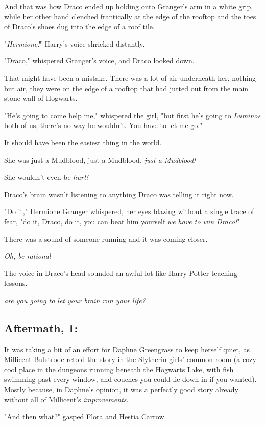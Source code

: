 And that was how Draco ended up holding onto Granger's arm in a white grip,
while her other hand clenched frantically at the edge of the rooftop and the
toes of Draco's shoes dug into the edge of a roof tile.

"\emph{Hermione!}" Harry's voice shrieked distantly.

"Draco," whispered Granger's voice, and Draco looked down.

That might have been a mistake. There was a lot of air underneath her, nothing
but air, they were on the edge of a rooftop that had jutted out from the main
stone wall of Hogwarts.

"He's going to come help me," whispered the girl, "but first he's going to
\emph{Luminos} both of us, there's no way he wouldn't. You have to let me go."

It should have been the easiest thing in the world.

She was just a Mudblood, just a Mudblood, \emph{just a Mudblood!}

She wouldn't even be \emph{hurt!}

{\el} Draco's brain wasn't listening to anything Draco was telling it right
now.

"Do it," Hermione Granger whispered, her eyes blazing without a single trace of
fear, "do it, Draco, do it, you can beat him yourself \emph{we have to win
Draco!}"

There was a sound of someone running and it was coming closer.

\emph{Oh, be rational{\el}}

The voice in Draco's head sounded an awful lot like Harry Potter teaching
lessons.

{\el} \emph{are you going to let your brain run your life?}
\sbreak
\subsection{Aftermath, 1:}

It was taking a bit of an effort for Daphne Greengrass to keep herself quiet,
as Millicent Bulstrode retold the story in the Slytherin girls' common room (a
cozy cool place in the dungeons running beneath the Hogwarts Lake, with fish
swimming past every window, and couches you could lie down in if you wanted).
Mostly because, in Daphne's opinion, it was a perfectly good story already
without all of Millicent's \emph{improvements}.

"And then what?" gasped Flora and Hestia Carrow.

